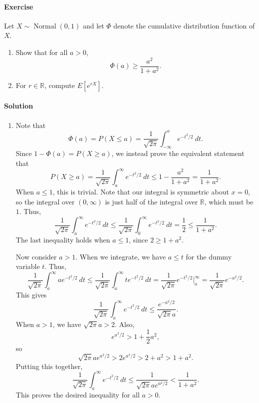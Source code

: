 \documentclass[10pt]{article}
\newcounter{prob}
\def\problem{\stepcounter{prob}\paragraph{Exercise \arabic{prob}}}
\def\solution{\paragraph{Solution}}
\newcommand\E[1]{E[#1]}
\begin{document}
        \problem Let $X \sim \operatorname{Normal}(0, 1)$ and let $\Phi$ denote the
        cumulative distribution function of $X$.
        \begin{enumerate}
            \itemsep0em
            \item Show that for all $a > 0$, \[
                \Phi(a) \geq \frac{a^2}{1 + a^2}.
            \] 
            \item For $r \in \mathbb{R}$, compute $\E{e^{rX}}$.
        \end{enumerate}

        \solution \begin{enumerate}
            \itemsep0em
            \item Note that \[
                \Phi(a) = P(X \leq a) = \frac{1}{\sqrt{2\pi}}\int_{-\infty}^a
                e^{-t^2 / 2}\:dt.
            \] Since $1 - \Phi(a) = P(X \geq a)$, we instead prove the equivalent
            statement that \[
                P(X \geq a) = \frac{1}{\sqrt{2\pi}}\int_a^\infty e^{-t^2 / 2}\:dt
                \leq 1 - \frac{a^2}{1 + a^2} = \frac{1}{1 + a^2}.
            \] When $a \leq 1$, this is trivial. Note that our integral is symmetric
            about $x = 0$, so the integral over $(0, \infty)$ is just half of the
            integral over $\mathbb{R}$, which must be $1$. Thus, \[
                \frac{1}{\sqrt{2\pi}}\int_a^\infty e^{-t^2 /2}\:dt \leq
                \frac{1}{\sqrt{2\pi}}\int_0^\infty e^{-t^2 /2}\:dt = \frac{1}{2}
                \leq \frac{1}{1 + a^2}.
            \] The last inequality holds when $a \leq 1$, since $2 \geq 1 + a^2$.

            Now consider $a > 1$. When we integrate, we have $a \leq t$ for the
            dummy variable $t$. Thus, \[
                \frac{1}{\sqrt{2\pi}}\int_a^\infty ae^{-t^2 / 2}\:dt \leq
                \frac{1}{\sqrt{2\pi}}\int_a^\infty te^{-t^2 / 2}\:dt =
                \frac{1}{\sqrt{2\pi}} e^{-t^2 / 2}\Big|_a^\infty = 
                \frac{1}{\sqrt{2\pi}}e^{-a^2 / 2}.
            \] This gives \[
                \frac{1}{\sqrt{2\pi}}\int_a^\infty e^{-t^2 / 2}\:dt \leq
                \frac{e^{-a^2 /2}}{\sqrt{2\pi} a}.
            \] When $a > 1$, we have $\sqrt{2\pi}a > 2$. Also, \[
                e^{a^2 / 2} > 1 + \frac{1}{2}a^2,
            \] so  \[
                \sqrt{2\pi}a e^{a^2 / 2} > 2e^{a^2 / 2} > 2 + a^2 > 1 + a^2.
            \] Putting this together, \[
                \frac{1}{\sqrt{2\pi}}\int_a^\infty e^{-t^2 / 2}\:dt \leq
                \frac{1}{\sqrt{2\pi}ae^{a^2 / 2}} < \frac{1}{1 + a^2}.
            \] This proves the desired inequality for all $a > 0$.


\end{enumerate}
\end{document}
